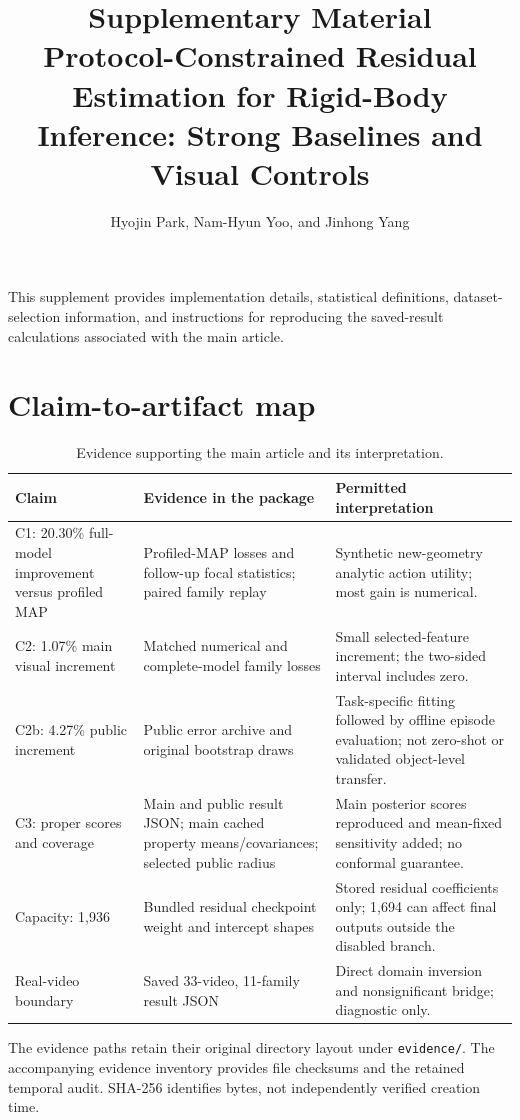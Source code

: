 \documentclass[11pt]{article}
\title{Supplementary Material\\\large Protocol-Constrained Residual Estimation for Rigid-Body Inference: Strong Baselines and Visual Controls}
\author{Hyojin Park, Nam-Hyun Yoo, and Jinhong Yang}
\date{}
\begin{document}
\maketitle
\noindent This supplement provides implementation details, statistical definitions, dataset-selection information, and instructions for reproducing the saved-result calculations associated with the main article.

\section{Claim-to-artifact map}
\begin{longtable}{p{}p{}p{}}
\caption{Evidence supporting the main article and its interpretation.}\\
\toprule Claim & Evidence in the package & Permitted interpretation\\\midrule\endhead
C1: 20.30\% full-model improvement versus profiled MAP & Profiled-MAP losses and follow-up focal statistics; paired family replay & Synthetic new-geometry analytic action utility; most gain is numerical.\\
C2: 1.07\% main visual increment & Matched numerical and complete-model family losses & Small selected-feature increment; the two-sided interval includes zero.\\
C2b: 4.27\% public increment & Public error archive and original bootstrap draws & Task-specific fitting followed by offline episode evaluation; not zero-shot or validated object-level transfer.\\
C3: proper scores and coverage & Main and public result JSON; main cached property means/covariances; selected public radius & Main posterior scores reproduced and mean-fixed sensitivity added; no conformal guarantee.\\
Capacity: 1,936 & Bundled residual checkpoint weight and intercept shapes & Stored residual coefficients only; 1,694 can affect final outputs outside the disabled branch.\\
Real-video boundary & Saved 33-video, 11-family result JSON & Direct domain inversion and nonsignificant bridge; diagnostic only.\\\bottomrule
\end{longtable}
The evidence paths retain their original directory layout under \texttt{evidence/}. The accompanying evidence inventory provides file checksums and the retained temporal audit. SHA-256 identifies bytes, not independently verified creation time.
\end{document}
